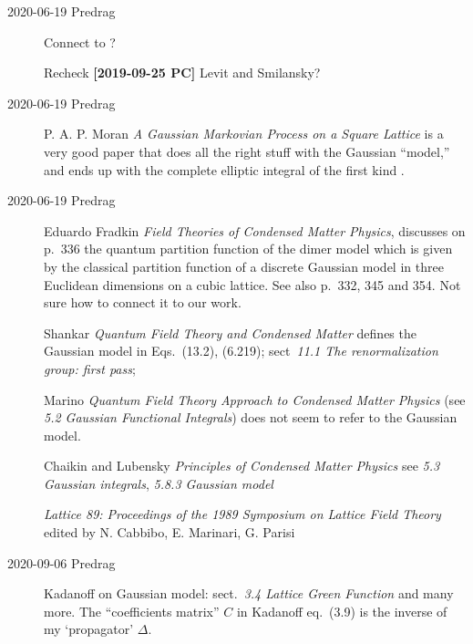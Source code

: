 \begin{description}
\item[2020-06-19 Predrag]

Connect to ?

Recheck {\bf [2019-09-25 PC]}
Levit and Smilansky?

\item[2020-06-19 Predrag]
P. A. P. Moran
{\em A Gaussian Markovian Process on a Square Lattice}
is a very good paper that does all the right stuff with the Gaussian
``model,'' and ends up with the complete elliptic integral of the first
kind .

\item[2020-06-19 Predrag]

Eduardo Fradkin {\em Field Theories of Condensed Matter Physics},
discusses on p.~336
the quantum partition function of the dimer model which is given by the classical
partition function of a discrete Gaussian model in three Euclidean dimensions on
a cubic lattice. See also p.~332, 345 and 354. Not sure how to connect it to our work.

Shankar {\em Quantum Field Theory and Condensed Matter}
defines the Gaussian model in Eqs.~(13.2), (6.219);
sect~{\em 11.1 The renormalization group: first pass};

Marino {\em Quantum Field Theory Approach to Condensed
Matter Physics}
(see {\em 5.2 Gaussian Functional Integrals}) does not seem to refer to
the Gaussian model.

Chaikin and Lubensky {\em Principles of Condensed Matter Physics}
see {\em 5.3 Gaussian integrals},  {\em 5.8.3 Gaussian model}

\emph{Lattice 89: Proceedings of the 1989 Symposium on Lattice Field Theory}
edited by N. Cabbibo, E. Marinari, G. Parisi

\item[2020-09-06 Predrag]
Kadanoff on Gaussian model:  sect.~{\em 3.4 Lattice Green Function}
and many more.
The ``coefficients matrix'' $C$ in Kadanoff eq.~(3.9) is the inverse
of my `propagator' $\Delta$.


\end{description}
